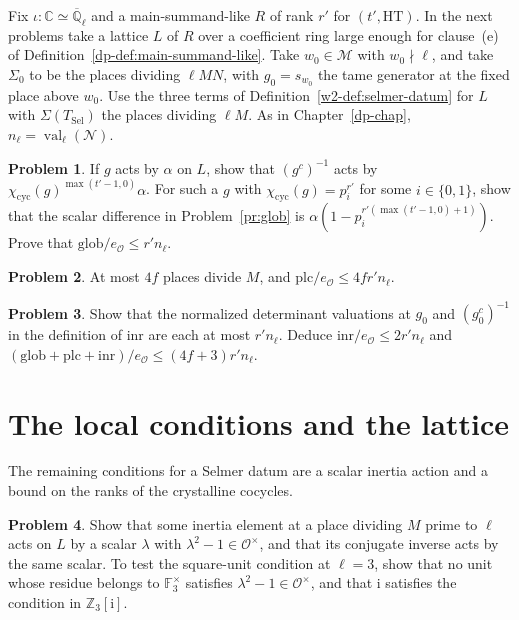 \documentclass[reqno]{amsart}
\newcounter{chap}
\theoremstyle{definition}
\newtheorem{problem}{Problem}[section]
\theoremstyle{plain}
\theoremstyle{remark}
\newcommand{\Z}{\mathbb Z}
\newcommand{\Q}{\mathbb Q}
\newcommand{\F}{\mathbb F}
\newcommand{\C}{\mathbb C}
\newcommand{\Oc}{\mathcal O}
\newcommand{\TS}{T_{\mathrm{Sel}}}
\newcommand{\cyc}{\chi_{\mathrm{cyc}}}
\newcommand{\val}{\operatorname{val}}
\begin{document}
Fix \(\iota\colon\C\simeq\overline{\Q}_\ell\) and a main-summand-like \(R\) of rank \(r'\) for \((t',\mathrm{HT})\).  In the next problems take a lattice \(L\) of \(R\) over a coefficient ring large enough for clause~(e) of Definition~\ref{dp-def:main-summand-like}.  Take \(w_0\in\mathcal M\) with \(w_0\nmid\ell\), and take \(\Sigma_0\) to be the places dividing \(\ell MN\), with \(g_0=s_{w_0}\) the tame generator at the fixed place above \(w_0\).  Use the three terms of Definition~\ref{w2-def:selmer-datum} for \(L\) with \(\Sigma(\TS)\) the places dividing \(\ell M\).  As in Chapter~\ref{dp-chap}, \(n_\ell=\val_\ell(\mathcal N)\).

\begin{problem}\label{pr:global-budget}
If \(g\) acts by \(\alpha\) on \(L\), show that \((g^c)^{-1}\) acts by \(\cyc(g)^{\max(t'-1,0)}\alpha\).  For such a \(g\) with \(\cyc(g)=p_i^{r'}\) for some \(i\in\{0,1\}\), show that the scalar difference in Problem~\ref{pr:glob} is \(\alpha(1-p_i^{r'(\max(t'-1,0)+1)})\).  Prove that \(\mathrm{glob}/e_{\Oc}\le r'n_\ell\).
\end{problem}

\begin{problem}\label{pr:place-budget}
At most \(4f\) places divide \(M\), and \(\mathrm{plc}/e_{\Oc}\le 4fr'n_\ell\).
\end{problem}

\begin{problem}\label{pr:inertia-budget}
Show that the normalized determinant valuations at \(g_0\) and \((g_0^c)^{-1}\) in the definition of \(\mathrm{inr}\) are each at most \(r'n_\ell\).  Deduce \(\mathrm{inr}/e_{\Oc}\le 2r'n_\ell\) and \((\mathrm{glob}+\mathrm{plc}+\mathrm{inr})/e_{\Oc}\le(4f+3)r'n_\ell\).
\end{problem}

\section{The local conditions and the lattice}\label{sec:datum}

The remaining conditions for a Selmer datum are a scalar inertia action and a bound on the ranks of the crystalline cocycles.

\begin{problem}\label{pr:scalar}
Show that some inertia element at a place dividing \(M\) prime to \(\ell\) acts on \(L\) by a scalar \(\lambda\) with \(\lambda^2-1\in\Oc^\times\), and that its conjugate inverse acts by the same scalar.  To test the square-unit condition at \(\ell=3\), show that no unit whose residue belongs to \(\F_3^\times\) satisfies \(\lambda^2-1\in\Oc^\times\), and that \(\mathrm i\) satisfies the condition in \(\Z_3[\mathrm i]\).
\end{problem}
\end{document}

